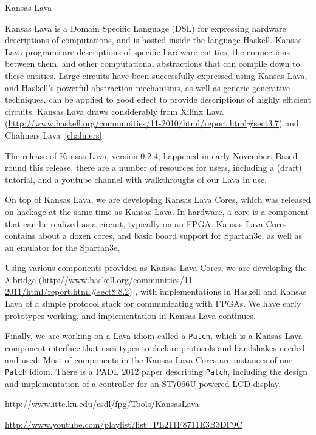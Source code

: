 \begin{hcarentry}{Kansas Lava}
\label{klava}
\makeheader

Kansas Lava is a Domain Specific Language (DSL) for expressing
hardware descriptions of computations, and is hosted inside the
language Haskell. Kansas Lava programs are descriptions of specific hardware
entities, the connections between them, and other computational abstractions
that can compile down to these entities. Large circuits have been successfully
expressed using Kansas Lava, and Haskell's powerful abstraction mechanisms, as
well as generic generative techniques, can be applied to good effect to provide
descriptions of highly efficient circuits.
Kansas Lava draws considerably from Xilinx Lava~%
(\url{http://www.haskell.org/communities/11-2010/html/report.html#sect3.7})
and
Chalmers Lava~\cref{chalmers}.

The release of Kansas Lava, version 0.2.4, happened in early November.
Based round this release, there are a number of resources for users,
including a (draft) tutorial, and a youtube channel with
walkthroughs of our Lava in use.

On top of Kansas Lava, we are developing Kansas Lava Cores, which was released
on hackage at the same time as Kansas Lava. In hardware, a core is a component
that can be realized as a circuit, typically on an FPGA. Kansas Lava Cores
contains about a dozen cores, and basic board support for Spartan3e,
as well as an emulator for the Spartan3e.

Using various components provided as Kansas Lava Cores, we are developing the
$\lambda$-bridge (\url{http://www.haskell.org/communities/11-2011/html/report.html#sect8.8.2})%
, with implementations in Haskell and
Kansas Lava of a simple protocol stack for communicating with FPGAs. We have
early prototypes working, and implementation in Kansas Lava continues.

Finally, we are working on a Lava idiom called a {\tt Patch}, which is a Kansas
Lava component interface that uses types to declare protocols and handshakes
needed and used. Most of components in the Kansas Lava Cores are instances of
our {\tt Patch} idiom. There is a PADL 2012 paper describing {\tt Patch},
including the design and implementation of a controller for an ST7066U-powered
LCD display.

\FurtherReading
\begin{compactitem}
\item
  \url{http://www.ittc.ku.edu/csdl/fpg/Tools/KansasLava}\\
\item
  \url{http://www.youtube.com/playlist?list=PL211F8711E3B3DF9C}  
\end{compactitem}
\end{hcarentry}

